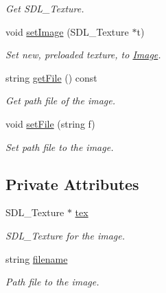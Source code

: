 \begin{DoxyCompactItemize}
\begin{DoxyCompactList}\small\item\em Get S\+D\+L\+\_\+\+Texture. \end{DoxyCompactList}\item 
void \hyperlink{classImage_af42b5d6a8abd90d67e9ae19e374520da}{set\+Image} (S\+D\+L\+\_\+\+Texture $\ast$t)\hypertarget{classImage_af42b5d6a8abd90d67e9ae19e374520da}{}\label{classImage_af42b5d6a8abd90d67e9ae19e374520da}

\begin{DoxyCompactList}\small\item\em Set new, preloaded texture, to \hyperlink{classImage}{Image}. \end{DoxyCompactList}\item 
string \hyperlink{classImage_aebc4cdd98961289324e6159b77ee3e69}{get\+File} () const \hypertarget{classImage_aebc4cdd98961289324e6159b77ee3e69}{}\label{classImage_aebc4cdd98961289324e6159b77ee3e69}

\begin{DoxyCompactList}\small\item\em Get path file of the image. \end{DoxyCompactList}\item 
void \hyperlink{classImage_ab4030489c65a25b2e0c458acac0ca94e}{set\+File} (string f)\hypertarget{classImage_ab4030489c65a25b2e0c458acac0ca94e}{}\label{classImage_ab4030489c65a25b2e0c458acac0ca94e}

\begin{DoxyCompactList}\small\item\em Set path file to the image. \end{DoxyCompactList}\end{DoxyCompactItemize}
\subsection*{Private Attributes}
\begin{DoxyCompactItemize}
\item 
S\+D\+L\+\_\+\+Texture $\ast$ \hyperlink{classImage_a279afb90349d79e9b99a98ed426faebe}{tex}\hypertarget{classImage_a279afb90349d79e9b99a98ed426faebe}{}\label{classImage_a279afb90349d79e9b99a98ed426faebe}

\begin{DoxyCompactList}\small\item\em S\+D\+L\+\_\+\+Texture for the image. \end{DoxyCompactList}\item 
string \hyperlink{classImage_ad05ed7043b84ee243cdf5b17066ff9cc}{filename}\hypertarget{classImage_ad05ed7043b84ee243cdf5b17066ff9cc}{}\label{classImage_ad05ed7043b84ee243cdf5b17066ff9cc}

\begin{DoxyCompactList}\small\item\em Path file to the image. \end{DoxyCompactList}\end{DoxyCompactItemize}


